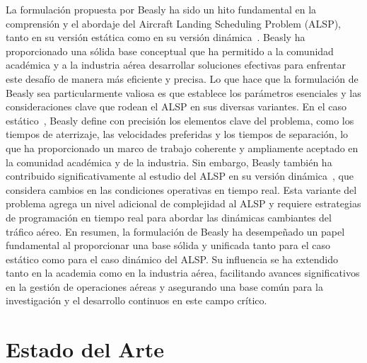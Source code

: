 \documentclass[letter, 10pt]{article}
\begin{document}
La formulaci\'on propuesta por Beasly ha sido un hito fundamental en la comprensi\'on y el abordaje del Aircraft Landing Scheduling Problem (ALSP), tanto en su versi\'on est\'atica como en su versi\'on din\'amica~\cite{Beasley2004}. Beasly ha proporcionado una s\'olida base conceptual que ha permitido a la comunidad acad\'emica y a la industria a\'erea desarrollar soluciones efectivas para enfrentar este desaf\'io de manera m\'as eficiente y precisa. Lo que hace que la formulaci\'on de Beasly sea particularmente valiosa es que establece los par\'ametros esenciales y las consideraciones clave que rodean el ALSP en sus diversas variantes. En el caso est\'atico~\cite{beasley1990scheduling}, Beasly define con precisi\'on los elementos clave del problema, como los tiempos de aterrizaje, las velocidades preferidas y los tiempos de separaci\'on, lo que ha proporcionado un marco de trabajo coherente y ampliamente aceptado en la comunidad acad\'emica y de la industria. Sin embargo, Beasly tambi\'en ha contribuido significativamente al estudio del ALSP en su versi\'on din\'amica~\cite{Beasley2004}, que considera cambios en las condiciones operativas en tiempo real. Esta variante del problema agrega un nivel adicional de complejidad al ALSP y requiere estrategias de programaci\'on en tiempo real para abordar las din\'amicas cambiantes del tr\'afico a\'ereo. En resumen, la formulaci\'on de Beasly ha desempe\~{n}ado un papel fundamental al proporcionar una base s\'olida y unificada tanto para el caso est\'atico como para el caso din\'amico del ALSP. Su influencia se ha extendido tanto en la academia como en la industria a\'erea, facilitando avances significativos en la gesti\'on de operaciones a\'ereas y asegurando una base com\'un para la investigaci\'on y el desarrollo continuos en este campo cr\'itico.

\section{Estado del Arte}
\begin{comment}
La informaci\'on que describen en este punto se basa en los estudios realizados con antelaci\'on respecto al tema. Lo m\'as importante que se ha hecho hasta ahora con relaci\'on al problema. Deber\'ia responder preguntas como las siguientes:
?`cu\'ando surge?, ?`qu\'e m\'etodos se han usado para resolverlo?, ?`cu\'ales son los mejores algoritmos que se han creado hasta
la fecha?, ?`qu\'e representaciones han tenido los mejores resultados?, ?`cu\'al es la tendencia actual para resolver el problema?, tipos de movimientos, heur\'isticas, m\'etodos completos, tendencias, etc... Puede incluir gr\'aficos comparativos o explicativos.\\
\end{comment}
\end{document}
